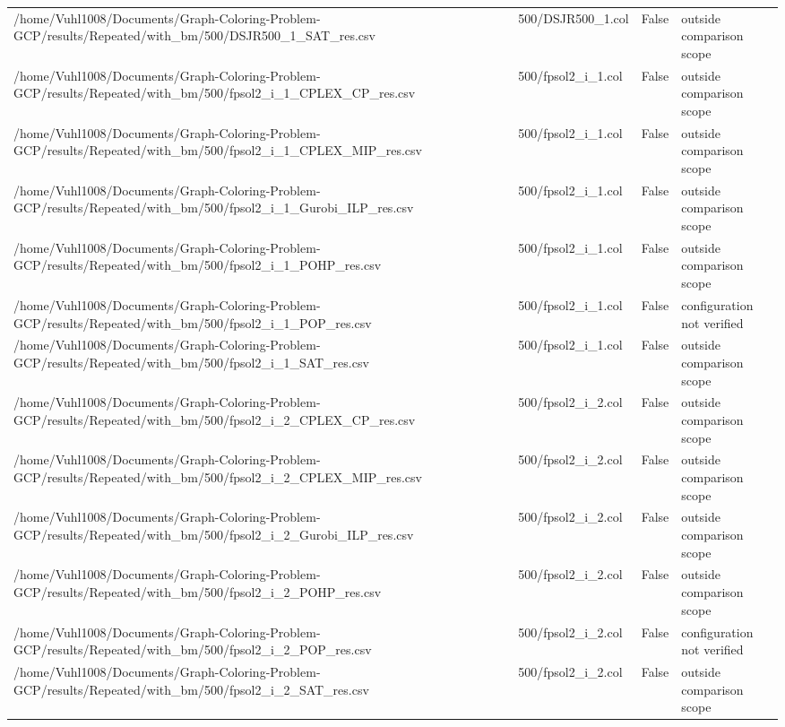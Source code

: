 \begin{table}[htbp]
\begin{tabular}{llll}
/home/Vuhl1008/Documents/Graph-Coloring-Problem-GCP/results/Repeated/with\_bm/500/DSJR500\_1\_SAT\_res.csv & 500/DSJR500\_1.col & False & outside comparison scope \\
/home/Vuhl1008/Documents/Graph-Coloring-Problem-GCP/results/Repeated/with\_bm/500/fpsol2\_i\_1\_CPLEX\_CP\_res.csv & 500/fpsol2\_i\_1.col & False & outside comparison scope \\
/home/Vuhl1008/Documents/Graph-Coloring-Problem-GCP/results/Repeated/with\_bm/500/fpsol2\_i\_1\_CPLEX\_MIP\_res.csv & 500/fpsol2\_i\_1.col & False & outside comparison scope \\
/home/Vuhl1008/Documents/Graph-Coloring-Problem-GCP/results/Repeated/with\_bm/500/fpsol2\_i\_1\_Gurobi\_ILP\_res.csv & 500/fpsol2\_i\_1.col & False & outside comparison scope \\
/home/Vuhl1008/Documents/Graph-Coloring-Problem-GCP/results/Repeated/with\_bm/500/fpsol2\_i\_1\_POHP\_res.csv & 500/fpsol2\_i\_1.col & False & outside comparison scope \\
/home/Vuhl1008/Documents/Graph-Coloring-Problem-GCP/results/Repeated/with\_bm/500/fpsol2\_i\_1\_POP\_res.csv & 500/fpsol2\_i\_1.col & False & configuration not verified \\
/home/Vuhl1008/Documents/Graph-Coloring-Problem-GCP/results/Repeated/with\_bm/500/fpsol2\_i\_1\_SAT\_res.csv & 500/fpsol2\_i\_1.col & False & outside comparison scope \\
/home/Vuhl1008/Documents/Graph-Coloring-Problem-GCP/results/Repeated/with\_bm/500/fpsol2\_i\_2\_CPLEX\_CP\_res.csv & 500/fpsol2\_i\_2.col & False & outside comparison scope \\
/home/Vuhl1008/Documents/Graph-Coloring-Problem-GCP/results/Repeated/with\_bm/500/fpsol2\_i\_2\_CPLEX\_MIP\_res.csv & 500/fpsol2\_i\_2.col & False & outside comparison scope \\
/home/Vuhl1008/Documents/Graph-Coloring-Problem-GCP/results/Repeated/with\_bm/500/fpsol2\_i\_2\_Gurobi\_ILP\_res.csv & 500/fpsol2\_i\_2.col & False & outside comparison scope \\
/home/Vuhl1008/Documents/Graph-Coloring-Problem-GCP/results/Repeated/with\_bm/500/fpsol2\_i\_2\_POHP\_res.csv & 500/fpsol2\_i\_2.col & False & outside comparison scope \\
/home/Vuhl1008/Documents/Graph-Coloring-Problem-GCP/results/Repeated/with\_bm/500/fpsol2\_i\_2\_POP\_res.csv & 500/fpsol2\_i\_2.col & False & configuration not verified \\
/home/Vuhl1008/Documents/Graph-Coloring-Problem-GCP/results/Repeated/with\_bm/500/fpsol2\_i\_2\_SAT\_res.csv & 500/fpsol2\_i\_2.col & False & outside comparison scope \\

\end{tabular}
\end{table}

